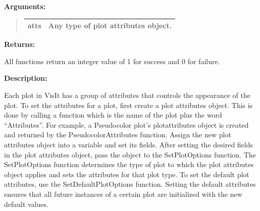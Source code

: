 \documentclass[letterpaper,10pt,english]{sphinxmanual}
\begin{document}
\begin{DUlineblock}{0em}
\item[] 
\item[] \textbf{Arguments:}
\end{DUlineblock}
\begin{quote}

\begin{tabulary}{\linewidth}{|L|L|}
\hline

atts
 & 
Any type of plot attributes object.
\\
\hline\end{tabulary}

\end{quote}

\begin{DUlineblock}{0em}
\item[] 
\item[] \textbf{Returns:}
\item[] All functions return an integer value of 1 for success and 0 for failure.
\item[] 
\item[] \textbf{Description:}
\item[] Each plot in VisIt has a group of attributes that controls the appearance
of the plot. To set the attributes for a plot, first create a plot
attributes object. This is done by calling a function which is the name of
the plot plus the word ``Attributes''. For example, a Pseudocolor plot's
plotattributes object is created and returned by the PseudocolorAttributes
function. Assign the new plot attributes object into a variable and set its
fields. After setting the desired fields in the plot attributes object,
pass the object to the SetPlotOptions function. The SetPlotOptions function
determines the type of plot to which the plot attributes object applies and
sets the attributes for that plot type. To set the default plot attributes,
use the SetDefaultPlotOptions function. Setting the default attributes
ensures that all future instances of a certain plot are initialized with
the new default values.
\end{DUlineblock}

\begin{DUlineblock}{0em}
\item[] 
\end{DUlineblock}
\end{document}
